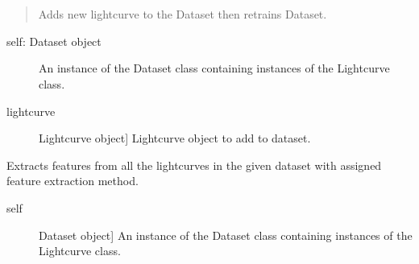 \documentclass[a4paper,10pt,english]{sphinxmanual}
\begin{document}
\begin{fulllineitems}
\label{\detokenize{api:malt.Dataset}}~

\begin{fulllineitems}
\label{\detokenize{api:malt.Dataset.add}}~\begin{quote}

Adds new lightcurve to the Dataset then retrains Dataset.
\end{quote}
\begin{description}
\item[{self: Dataset object}] \leavevmode
An instance of the Dataset class containing instances of the
Lightcurve class.

\item[{lightcurve}] \leavevmode{[}Lightcurve object{]}
Lightcurve object to add to dataset.

\end{description}

\end{fulllineitems}


\begin{fulllineitems}
\label{\detokenize{api:malt.Dataset.extract_features}}
Extracts features from all the lightcurves in the given dataset with
assigned feature extraction method.
\begin{description}
\item[{self}] \leavevmode{[}Dataset object{]}
An instance of the Dataset class containing instances of the
Lightcurve class.


\end{description}
\end{fulllineitems}
\end{fulllineitems}
\end{document}
